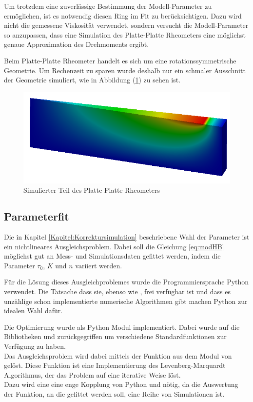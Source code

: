 Um trotzdem eine zuverlässige Bestimmung der Modell-Parameter zu ermöglichen, ist es notwendig diesen Ring im Fit zu berücksichtigen. Dazu wird nicht die gemessene Viskosität verwendet, sondern versucht die Modell-Parameter so anzupassen, dass eine Simulation des Platte-Platte Rheometers eine möglichst genaue Approximation des Drehmoments ergibt.

Beim Platte-Platte Rheometer handelt es sich um eine rotationssymmetrische Geometrie. Um Rechenzeit zu sparen wurde deshalb nur ein schmaler Ausschnitt der Geometrie simuliert, wie in Abbildung (\ref{fig:plattePlatteRheo})  zu sehen ist.\\
\begin{figure}
\caption{Simulierter Teil des Platte-Platte Rheometers}
\label{fig:plattePlatteRheo}
\centering
\includegraphics[width=.6\textwidth]{figures/plattenRheometerSchnitz.png}
\end{figure}
%
\subsection{Parameterfit}
Die in Kapitel \ref{Kapitel:Korrektursimulation} beschriebene Wahl der Parameter ist ein nichtlineares Ausgleichsproblem. Dabei soll die Gleichung \eqref{eq:modHB} möglichst gut an Mess- und Simulationsdaten gefittet werden, indem die Parameter $\tau_0$, $K$ und $n$ variiert werden.

Für die Lösung dieses Ausgleichproblemes wurde die Programmiersprache Python verwendet. Die Tatsache dass sie, ebenso wie \openfoam{}, frei verfügbar  ist und dass es unzählige schon implementierte numerische Algorithmen gibt machen Python zur idealen Wahl dafür.

Die Optimierung wurde als Python Modul  implementiert. Dabei wurde auf die Bibliotheken  und   zurückgegriffen um verschiedene Standardfunktionen zur Verfügung zu haben.\\
Das Ausgleichsproblem wird dabei mittels der Funktion  aus dem Modul  von  gelöst.
Diese Funktion ist eine Implementierung des Levenberg-Marquardt Algorithmus, der das Problem auf eine iterative Weise löst.\\
Dazu wird eine eine enge Kopplung von Python und \openfoam{} nötig, da die Auswertung der Funktion, an die gefittet werden soll, eine Reihe von Simulationen ist.

